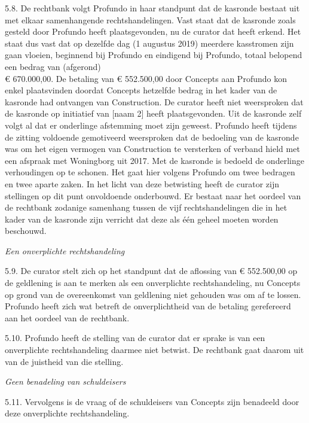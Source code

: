 \documentclass[
  dutch,
  a4paper,
]{article}
\begin{document}
5.8. De rechtbank volgt Profundo in haar standpunt dat de kasronde bestaat uit met elkaar samenhangende rechtshandelingen. Vast staat dat de kasronde zoals gesteld door Profundo heeft plaatsgevonden, nu de curator dat heeft erkend. Het staat dus vast dat op dezelfde dag (1 augustus 2019) meerdere kasstromen zijn gaan vloeien, beginnend bij Profundo en eindigend bij Profundo, totaal belopend een bedrag van (afgerond)\\
€ 670.000,00. De betaling van € 552.500,00 door Concepts aan Profundo kon enkel plaatsvinden doordat Concepts hetzelfde bedrag in het kader van de kasronde had ontvangen van Construction. De curator heeft niet weersproken dat de kasronde op initiatief van {[}naam 2{]} heeft plaatsgevonden. Uit de kasronde zelf volgt al dat er onderlinge afstemming moet zijn geweest. Profundo heeft tijdens de zitting voldoende gemotiveerd weersproken dat de bedoeling van de kasronde was om het eigen vermogen van Construction te versterken of verband hield met een afspraak met Woningborg uit 2017. Met de kasronde is bedoeld de onderlinge verhoudingen op te schonen. Het gaat hier volgens Profundo om twee bedragen en twee aparte zaken. In het licht van deze betwisting heeft de curator zijn stellingen op dit punt onvoldoende onderbouwd. Er bestaat naar het oordeel van de rechtbank zodanige samenhang tussen de vijf rechtshandelingen die in het kader van de kasronde zijn verricht dat deze als één geheel moeten worden beschouwd.

\emph{Een onverplichte rechtshandeling}

5.9. De curator stelt zich op het standpunt dat de aflossing van € 552.500,00 op de geldlening is aan te merken als een onverplichte rechtshandeling, nu Concepts op grond van de overeenkomst van geldlening niet gehouden was om af te lossen. Profundo heeft zich wat betreft de onverplichtheid van de betaling gerefereerd aan het oordeel van de rechtbank.

5.10. Profundo heeft de stelling van de curator dat er sprake is van een onverplichte rechtshandeling daarmee niet betwist. De rechtbank gaat daarom uit van de juistheid van die stelling.

\emph{Geen benadeling van schuldeisers}

5.11. Vervolgens is de vraag of de schuldeisers van Concepts zijn benadeeld door deze onverplichte rechtshandeling.
\end{document}
